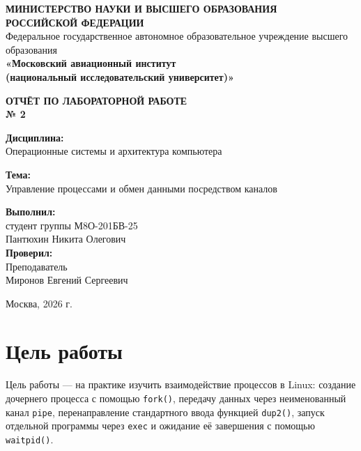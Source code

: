 \documentclass[12pt,a4paper]{article}
\newcommand{\studentName}{Пантюхин Никита Олегович}
\newcommand{\studentGroup}{М8О-201БВ-25}
\newcommand{\checkerName}{Миронов Евгений Сергеевич}
\begin{document}
\begin{titlepage}
\thispagestyle{empty}
\begin{center}
{\fontsize{10}{12}\selectfont\bfseries
МИНИСТЕРСТВО НАУКИ И ВЫСШЕГО ОБРАЗОВАНИЯ\\
РОССИЙСКОЙ ФЕДЕРАЦИИ}\\[0.2cm]
{\fontsize{10}{12}\selectfont
Федеральное государственное автономное образовательное учреждение высшего образования\\
\textbf{«Московский авиационный институт\\
(национальный исследовательский университет)»}}

\vspace{2.2cm}
{\fontsize{16}{19}\selectfont\bfseries ОТЧЁТ ПО ЛАБОРАТОРНОЙ РАБОТЕ}\\[0.15cm]
{\fontsize{16}{19}\selectfont\bfseries № 2}

\vspace{0.9cm}
\textbf{Дисциплина:}\\[0.15cm]
Операционные системы и архитектура компьютера

\vspace{0.7cm}
\textbf{Тема:}\\[0.15cm]
Управление процессами и обмен данными посредством каналов

\vspace{2.0cm}
\begin{flushright}
\textbf{Выполнил:}\\[0.15cm]
студент группы \studentGroup\\[0.1cm]
\studentName\\[0.6cm]
\textbf{Проверил:}\\[0.15cm]
Преподаватель\\[0.1cm]
\checkerName
\end{flushright}

\vfill
Москва, 2026 г.
\end{center}
\end{titlepage}

\setcounter{page}{2}
\tableofcontents
\newpage

\section{Цель работы}

Цель работы --- на практике изучить взаимодействие процессов в Linux: создание дочернего процесса с помощью \texttt{fork()}, передачу данных через неименованный канал \texttt{pipe}, перенаправление стандартного ввода функцией \texttt{dup2()}, запуск отдельной программы через \texttt{exec} и ожидание её завершения с помощью \texttt{waitpid()}.
\end{document}
